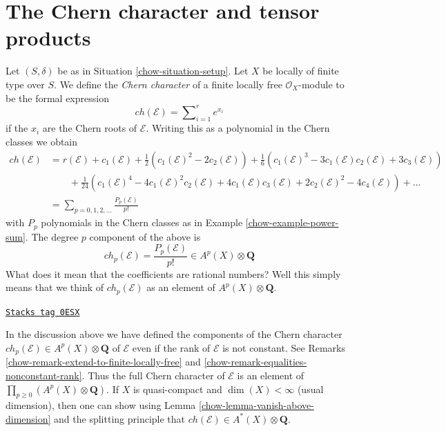 \section{The Chern character and tensor products}
\label{chow-section-chern-classes-tensor}
Let $(S, \delta)$ be as in Situation \ref{chow-situation-setup}.
Let $X$ be locally of finite type over $S$.
We define the {\it Chern character} of a finite locally free
$\mathcal{O}_X$-module to be the formal expression
$$
ch({\mathcal E}) = \sum\nolimits_{i=1}^r e^{x_i}
$$
if the $x_i$ are the Chern roots of ${\mathcal E}$. Writing this
as a polynomial in the Chern classes we obtain
\begin{align*}
ch(\mathcal{E})
& =
r(\mathcal{E})
+
c_1(\mathcal{E}) +
\frac{1}{2}(c_1(\mathcal{E})^2 - 2c_2(\mathcal{E}))
+
\frac{1}{6}(c_1(\mathcal{E})^3 - 3c_1(\mathcal{E})c_2(\mathcal{E}) + 3c_3(\mathcal{E})) \\
& \quad\quad +
\frac{1}{24}(c_1(\mathcal{E})^4 - 4c_1(\mathcal{E})^2c_2(\mathcal{E}) + 4c_1(\mathcal{E})c_3(\mathcal{E}) + 2c_2(\mathcal{E})^2 - 4c_4(\mathcal{E}))
+
\ldots \\
& =
\sum\nolimits_{p = 0, 1, 2, \ldots} \frac{P_p(\mathcal{E})}{p!}
\end{align*}
with $P_p$ polynomials in the Chern classes as in
Example \ref{chow-example-power-sum}. The degree $p$ component of
the above is
$$
ch_p(\mathcal{E}) = \frac{P_p(\mathcal{E})}{p!} \in A^p(X) \otimes \mathbf{Q}
$$
What does it mean that the coefficients are rational numbers?
Well this simply means that we think of
$ch_p(\mathcal{E})$ as an element of $A^p(X) \otimes \mathbf{Q}$.

\begin{remark}
\label{chow-remark-extend-chern-character-to-finite-locally-free}
\href{https://stacks.math.columbia.edu/tag/0ESX}{\texttt{Stacks tag 0ESX}}

In the discussion above we have defined the components of the Chern character
$ch_p(\mathcal{E}) \in A^p(X) \otimes \mathbf{Q}$
of $\mathcal{E}$ even if the rank of $\mathcal{E}$
is not constant. See Remarks \ref{chow-remark-extend-to-finite-locally-free} and
\ref{chow-remark-equalities-nonconstant-rank}. Thus the full Chern character
of $\mathcal{E}$ is
an element of $\prod_{p \geq 0} (A^p(X) \otimes \mathbf{Q})$. If $X$
is quasi-compact and $\dim(X) < \infty$ (usual dimension), then one can show
using Lemma \ref{chow-lemma-vanish-above-dimension} and the splitting principle
that $ch(\mathcal{E}) \in A^*(X) \otimes \mathbf{Q}$.
\end{remark}

